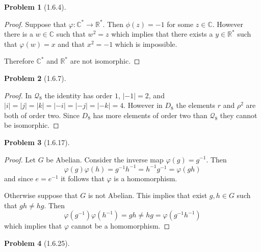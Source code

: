 \documentclass[10pt]{article}
\newcommand{\sk}{\vskip 10mm}
\newcommand{\bb}[1]{\mathbb{#1}}
\theoremstyle{plain}
\newtheorem{problem}{Problem}
\theoremstyle{remark}
\begin{document}
\sk

\begin{problem}[1.6.4]
  
\end{problem}

\begin{proof}
  Suppose that $\varphi:\bb{C}^*\rightarrow\bb{R}^*$. Then $\phi(z)=-1$ for some
  $z\in\bb{C}$. However there is a $w\in \bb{C}$ such that $w^2=z$
  which implies that there exists a $y\in\bb{R}^*$ such that
  $\varphi(w)=x$ and that $x^2=-1$ which is impossible.

  Therefore $\bb{C}^*$ and $\bb{R}^*$ are not isomorphic.
\end{proof}

\sk

\begin{problem}[1.6.7]
  
\end{problem}

\begin{proof}
  In $\mathcal{Q}_8$ the identity has order $1$, $|-1|=2$, and
  $|i|=|j|=|k|=|-i|=|-j|=|-k|=4$. However in $D_8$ the elements
  $r$ and $\rho^2$ are both of order two. Since $D_8$ has more
  elements of order two than $\mathcal{Q}_8$ they cannot be
  isomorphic.
\end{proof}

\sk

\begin{problem}[1.6.17]
  
\end{problem}

\begin{proof}
  Let $G$ be Abelian. Consider the inverse map $\varphi(g)=g^{-1}$.
  Then
  \[ \varphi(g)\varphi(h)=g^{-1}h^{-1}=h^{-1}g^{-1}=\varphi(gh)\]
  and since $e=e^{-1}$ it follows that $\varphi$ is a homomorphism.

  Otherwise suppose that $G$ is not Abelian. This implies that
  exist $g,h\in G$ such that $gh\neq hg$. Then
  \[ \varphi(g^{-1})\varphi(h^{-1})=gh\neq hg = \varphi(g^{-1}h^{-1})\]
  which implies that $\varphi$ cannot be a homomorphism.
\end{proof}

\sk

\begin{problem}[1.6.25]
  
\end{problem}
\end{document}
